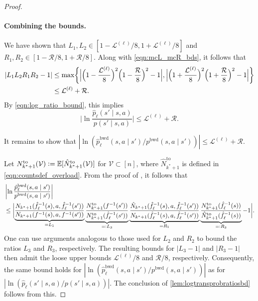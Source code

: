 \documentclass[11pt]{article}
\newcommand{\defeq}{=\vcentcolon}
\newcommand{\eqdef}{\vcentcolon=}
\newcommand{\mcL}{\mathcal{L}}
\newcommand{\mcR}{\mathcal{R}}
\newcommand{\mcV}{\mathcal{V}}
\newcommand{\mbbE}{\mathbb{E}}
\theoremstyle{definition}
\theoremstyle{definition}
\begin{document}
\begin{proof}
	\paragraph{Combining the bounds.}
	We have shown that $L_1,L_2\in[1-\mcL^{(\ell)}/8,1+\mcL^{(\ell)}/8]$ and $R_1,R_2\in[1-\mcR/8,1+\mcR/8]$.
	Along with \eqref{eqn:mcL_mcR_bds}, it follows that
	\begin{align}
		|L_1L_2R_1R_2-1|
			&
		\leq
		\max
		\biggl\{\Bigl|\Bigl(1-\frac{\mcL^{(\ell)}}{8}\Bigr)^2\Bigl(1-\frac{\mcR}{8}\Bigr)^2-1\Bigr|,\Bigl|\Bigl(1+\frac{\mcL^{(\ell)}}{8}\Bigr)^2\Bigl(1+\frac{\mcR}{8}\Bigr)^2-1\Bigr|\biggr\}
		\nonumber
		\\
			&
		\leq
		\mcL^{(\ell)}+\mcR
		.
	\end{align}
	By \eqref{eqn:log_ratio_bound}, this implies
	\begin{equation}
		\biggl|\ln\frac{\hat{p}_{\ell}(s'\mid s,a)}{p(s'\mid s,a)}\biggr|
		\leq
		\mcL^{(\ell)}+\mcR
		.
	\end{equation}

	It remains to show that $|\ln(\hat{p}_{\ell}^{\mathrm{bwd}}(s,a\mid s')/p^{\mathrm{bwd}}(s,a\mid s'))|\leq \mcL^{(\ell)}+\mcR$.

	Let $N_{k^*+1}^{\mathrm{to}}(\mcV)\eqdef \mbbE[\hat{N}_{k^*+1}^{\mathrm{to}}(\mcV)]$ for $\mcV\subset[n]$, where $\hat{N}_{k^*+1}^{\mathrm{to}}$ is defined in \eqref{eqn:countsdef_overload}.
	From the proof of \cite[Lemma 25]{Jedra:2022}, it follows that
	\begin{align}
		 &
		\left|\ln\frac{\hat{p}_{\ell}^{\mathrm{bwd}}(s,a\mid s')}{p^{\mathrm{bwd}}(s,a\mid s')}\right|
		\\
		 &
		\leq
		\biggl|
		\underbrace{\frac{N_{k^*+1}(\hat{f}_{\ell}^{-1}(s),a,\hat{f}_{\ell}^{-1}(s'))}{N_{k^*+1}(f^{-1}(s),a,f^{-1}(s'))}}_{=L_1}
		\underbrace{\frac{N_{k^*+1}^{\mathrm{to}}(f^{-1}(s'))}{N_{k^*+1}^{\mathrm{to}}(\hat{f}_{\ell}^{-1}(s'))}}_{\defeq L_3}
		\underbrace{\frac{\hat{N}_{k^*+1}(\hat{f}_{\ell}^{-1}(s),a,\hat{f}_{\ell}^{-1}(s'))}{N_{k^*+1}(\hat{f}_{\ell}^{-1}(s),a,\hat{f}_{\ell}^{-1}(s'))}}_{=R_1}
		\underbrace{\frac{N_{k^*+1}^{\mathrm{to}}(\hat{f}_{\ell}^{-1}(s))}{\hat{N}_{k^*+1}^{\mathrm{to}}(\hat{f}_{\ell}^{-1}(s))}}_{\defeq R_3}-1
		\biggr|.
		\nonumber
	\end{align}
	One can use arguments analogous to those used for $L_2$ and $R_2$ to bound the ratios $L_3$ and $R_3$, respectively.
	The resulting bounds for $|L_3-1|$ and $|R_3-1|$ then admit the loose upper bounds $\mcL^{(\ell)}/8$ and $\mcR/8$, respectively.
	Consequently, the same bound holds for $|\ln(\hat{p}_{\ell}^{\mathrm{bwd}}(s,a\mid s')/\allowbreak p^{\mathrm{bwd}}(s,a\mid s'))|$ as for $|\ln(\hat{p}_{\ell}(s'\mid s,a)\allowbreak /\allowbreak p(s'\mid s,a))|$.
	The conclusion of \cref{lem:logtransprobratiosbd} follows from this.
\end{proof}
\end{document}
